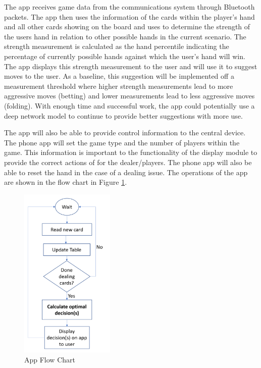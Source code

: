 \documentclass[12pt]{article}
\begin{document}
The app receives game data from the communications system through Bluetooth packets. The app then uses the information of the cards within the player's hand and all other cards showing on the board and uses to determine the strength of the users hand in relation to other possible hands in the current scenario. The strength measurement is calculated as the hand percentile indicating the percentage of currently possible hands against which the user's hand will win. The app displays this strength measurement to the user and will use it to suggest moves to the user. As a baseline, this suggestion will be implemented off a measurement threshold where higher strength measurements lead to more aggressive moves (betting) and lower measurements lead to less aggressive moves (folding). With enough time and successful work, the app could potentially use a deep network model to continue to provide better suggestions with more use.

The app will also be able to provide control information to the central device. The phone app will set the game type and the number of players within the game. This information is important to the functionality of the display module to provide the correct actions of for the dealer/players. The phone app will also be able to reset the hand in the case of a dealing issue. The operations of the app are shown in the flow chart in Figure \ref{fig:app_flow}.

\begin{figure}[!h]
	\centering
	\includegraphics[width=0.4\textwidth]{app_flow.png}
	\caption{App Flow Chart}
	\label{fig:app_flow}
\end{figure}
\end{document}
